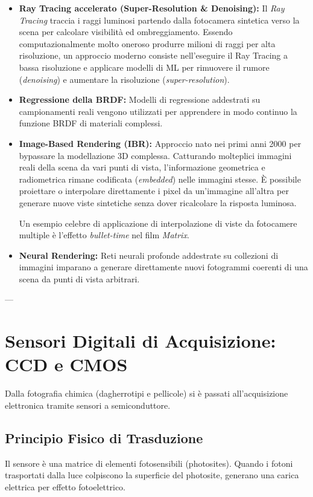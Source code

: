 \begin{itemize}
    \item \textbf{Ray Tracing accelerato (Super-Resolution \& Denoising):} Il \textit{Ray Tracing} traccia i raggi luminosi partendo dalla fotocamera sintetica verso la scena per calcolare visibilità ed ombreggiamento. Essendo computazionalmente molto oneroso produrre milioni di raggi per alta risoluzione, un approccio moderno consiste nell'eseguire il Ray Tracing a bassa risoluzione e applicare modelli di ML per rimuovere il rumore (\textit{denoising}) e aumentare la risoluzione (\textit{super-resolution}).
    \item \textbf{Regressione della BRDF:} Modelli di regressione addestrati su campionamenti reali vengono utilizzati per apprendere in modo continuo la funzione BRDF di materiali complessi.
    \item \textbf{Image-Based Rendering (IBR):} Approccio nato nei primi anni 2000 per bypassare la modellazione $3\text{D}$ complessa. Catturando molteplici immagini reali della scena da vari punti di vista, l'informazione geometrica e radiometrica rimane codificata (\textit{embedded}) nelle immagini stesse. È possibile proiettare o interpolare direttamente i pixel da un'immagine all'altra per generare nuove viste sintetiche senza dover ricalcolare la risposta luminosa. 
    
    Un esempio celebre di applicazione di interpolazione di viste da fotocamere multiple è l'effetto \textit{bullet-time} nel film \textit{Matrix}.
    \item \textbf{Neural Rendering:} Reti neurali profonde addestrate su collezioni di immagini imparano a generare direttamente nuovi fotogrammi coerenti di una scena da punti di vista arbitrari.
\end{itemize}

---

\section{Sensori Digitali di Acquisizione: CCD e CMOS}

Dalla fotografia chimica (dagherrotipi e pellicole) si è passati all'acquisizione elettronica tramite sensori a semiconduttore.

\subsection{Principio Fisico di Trasduzione}
Il sensore è una matrice di elementi fotosensibili (photosites). Quando i fotoni trasportati dalla luce colpiscono la superficie del photosite, generano una carica elettrica per effetto fotoelettrico. 

